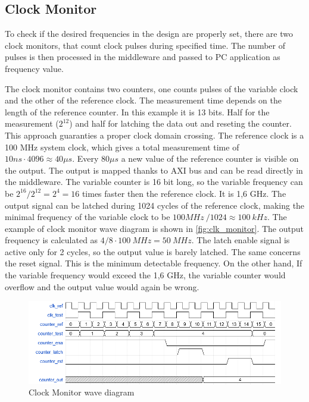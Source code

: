 \subsection{Clock Monitor}
To check if the desired frequencies in the design are properly set, there are two clock monitors, that count clock pulses during specified time. The number of pulses is then processed in the middleware and passed to PC application as frequency value. 

The clock monitor contains two counters, one counts pulses of the variable clock and the other of the reference clock. The measurement time depends on the length of the reference counter. In this example it is 13 bits. Half for the measurement ($2^{12}$) and half for latching the data out and reseting the counter. This approach guaranties a proper clock domain crossing. The reference clock is a 100 MHz system clock, which gives a total measurement time of $10ns \cdot 4096 \approx 40 \mu s$. Every $80 \mu s$ a new value of the reference counter is visible on the output. The output is mapped thanks to AXI bus and can be read directly in the middleware. The variable counter is 16 bit long, so the variable frequency can be $2^{16}/2^{12} = 2^4 = 16$ times faster then the reference clock. It is 1,6 GHz. The output signal can be latched during 1024 cycles of the reference clock, making the minimal frequency of the variable clock to be $100MHz\ / 1024 \approx 100 \ kHz$. The example of clock monitor wave diagram is shown in \autoref{fig:clk_monitor}. The output frequency is calculated as $4/8 \cdot 100 \ MHz = 50\ MHz$. The latch enable signal is active only for 2 cycles, so the output value is barely latched. The same concerns the reset signal. This is the minimum detectable frequency. On the other hand, If the variable frequency would exceed the 1,6 GHz, the variable counter would overflow and the output value would again be wrong.

\begin{figure}[h]
\centering
\includegraphics[width=\textwidth]{figures/clk_monitor.png}
\caption{Clock Monitor wave diagram}
\label{fig:clk_monitor}
\end{figure}

